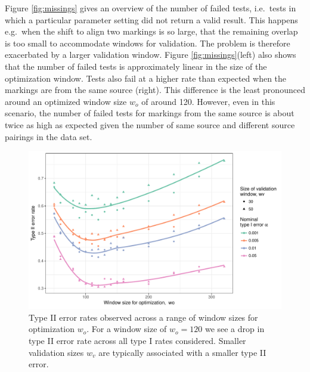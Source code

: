 \documentclass[12pt]{article}
\begin{document}
Figure \ref{fig:missings} gives an overview of the number of failed
tests, i.e.~tests in which a particular parameter setting did not return
a valid result. This happens e.g.~when the shift to align two markings
is so large, that the remaining overlap is too small to accommodate
windows for validation. The problem is therefore exacerbated by a larger
validation window. Figure \ref{fig:missings}(left) also shows that the
number of failed tests is approximately linear in the size of the
optimization window. Tests also fail at a higher rate than expected when
the markings are from the same source (right). This difference is the
least pronounced around an optimized window size \(w_o\) of around 120.
However, even in this scenario, the number of failed tests for markings
from the same source is about twice as high as expected given the number
of same source and different source pairings in the data set.

\begin{figure}

{\centering \includegraphics[width=.8\textwidth]{figures/type2-1} 

}

\caption{Type II error rates observed across a range of window sizes for optimization $w_o$. For a window size of $w_o = 120$ we see a drop in type II error rate across all type I rates considered. Smaller validation sizes $w_v$ are typically associated with a smaller type II error.}\label{fig:type2}
\end{figure}
\end{document}
